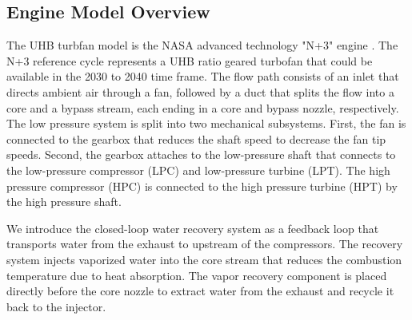 \documentclass[conf]{new-aiaa}
\begin{document}
\subsection{Engine Model Overview}
The UHB turbfan model is the NASA advanced technology "N+3" engine \cite{Jones2017a}.
The N+3 reference cycle represents a UHB ratio geared turbofan that could be available in the 2030 to 2040 time frame.
The flow path consists of an inlet that directs ambient air through a fan, followed by a duct that splits the flow into a core and a bypass stream, each ending in a core and bypass nozzle, respectively.
The low pressure system is split into two mechanical subsystems.
First, the fan is connected to the gearbox that reduces the shaft speed to decrease the fan tip speeds.
Second, the gearbox attaches to the low-pressure shaft that connects to the low-pressure compressor (LPC) and low-pressure turbine (LPT).
The high pressure compressor (HPC) is connected to the high pressure turbine (HPT) by the high pressure shaft.

We introduce the closed-loop water recovery system as a feedback loop that transports water from the exhaust to upstream of the compressors.
The recovery system injects vaporized water into the core stream that reduces the combustion temperature due to heat absorption.
The vapor recovery component is placed directly before the core nozzle to extract water from the exhaust and recycle it back to the injector.
\end{document}
